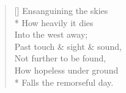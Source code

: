 \documentclass[MAIN]{subfiles}
\begin{document}
\settowidth{\versewidth}{Past touch \& sight \& sound,}
\begin{verse}[\versewidth]
Ensanguining the skies\\*
How heavily it dies\\
\vin Into the west away;\\
Past touch \& sight \& sound,\\
Not further to be found,\\
How hopeless under ground\\*
\vin Falls the remorseful day.
\end{verse}
\end{document}
